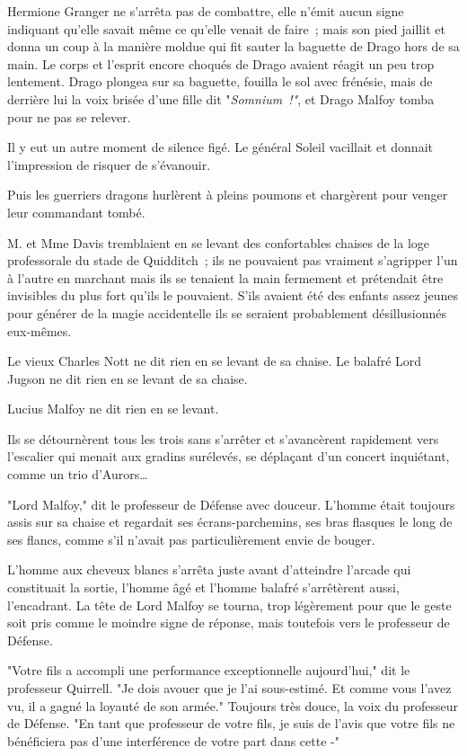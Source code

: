 Hermione Granger ne s'arrêta pas de combattre, elle n'émit aucun signe indiquant qu'elle savait même ce qu'elle venait de faire~; mais son pied jaillit et donna un coup à la manière moldue qui fit sauter la baguette de Drago hors de sa main. Le corps et l'esprit encore choqués de Drago avaient réagit un peu trop lentement. Drago plongea sur sa baguette, fouilla le sol avec frénésie, mais de derrière lui la voix brisée d'une fille dit "\emph{Somnium~!"}, et Drago Malfoy tomba pour ne pas se relever.

Il y eut un autre moment de silence figé. Le général Soleil vacillait et donnait l'impression de risquer de s'évanouir.

Puis les guerriers dragons hurlèrent à pleins poumons et chargèrent pour venger leur commandant tombé.

\later

M. et Mme Davis tremblaient en se levant des confortables chaises de la loge professorale du stade de Quidditch~; ils ne pouvaient pas vraiment s'agripper l'un à l'autre en marchant mais ils se tenaient la main fermement et prétendait être invisibles du plus fort qu'ils le pouvaient. S'ils avaient été des enfants assez jeunes pour générer de la magie accidentelle ils se seraient probablement désillusionnés eux-mêmes.

Le vieux Charles Nott ne dit rien en se levant de sa chaise. Le balafré Lord Jugson ne dit rien en se levant de sa chaise.

Lucius Malfoy ne dit rien en se levant.

Ils se détournèrent tous les trois sans s'arrêter et s'avancèrent rapidement vers l'escalier qui menait aux gradins surélevés, se déplaçant d'un concert inquiétant, comme un trio d'Aurors…

"Lord Malfoy," dit le professeur de Défense avec douceur. L'homme était toujours assis sur sa chaise et regardait ses écrans-parchemins, ses bras flasques le long de ses flancs, comme s'il n'avait pas particulièrement envie de bouger.

L'homme aux cheveux blancs s'arrêta juste avant d'atteindre l'arcade qui constituait la sortie, l'homme âgé et l'homme balafré s'arrêtèrent aussi, l'encadrant. La tête de Lord Malfoy se tourna, trop légèrement pour que le geste soit pris comme le moindre signe de réponse, mais toutefois vers le professeur de Défense.

"Votre fils a accompli une performance exceptionnelle aujourd'hui," dit le professeur Quirrell. "Je dois avouer que je l'ai sous-estimé. Et comme vous l'avez vu, il a gagné la loyauté de son armée." Toujours très douce, la voix du professeur de Défense. "En tant que professeur de votre fils, je suis de l'avis que votre fils ne bénéficiera pas d'une interférence de votre part dans cette -"

